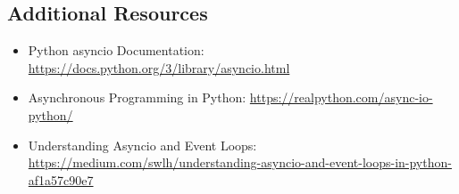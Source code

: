 \begin{tcolorbox}[
colback=pinkcolor!10!white,
colframe=pinkcolor!100!red,
left=2mm,
right=2mm,
title=\small\centering\textcolor{black}{Complete Guide to await asyncio.sleep() Issues},
breakable=true
]
\section*{Additional Resources}
\begin{itemize}
\item Python asyncio Documentation: \url{https://docs.python.org/3/library/asyncio.html}
\item Asynchronous Programming in Python: \url{https://realpython.com/async-io-python/}
\item Understanding Asyncio and Event Loops: \url{https://medium.com/swlh/understanding-asyncio-and-event-loops-in-python-af1a57c90e7}
\end{itemize}

\end{tcolorbox}